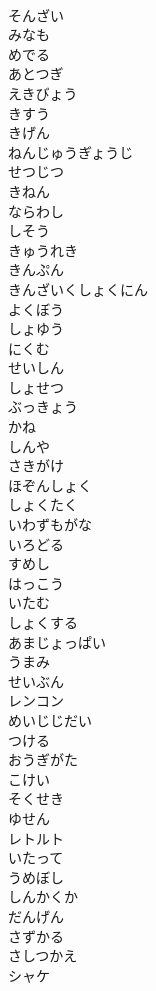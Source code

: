 \documentclass[8pt]{extreport}
\begin{document}
\begin{CJK}{UTF8}{min}
\\	そんざい
\\	みなも
\\	めでる
\\	あとつぎ
\\	えきびょう
\\	きすう
\\	きげん
\\	ねんじゅうぎょうじ
\\	せつじつ
\\	きねん
\\	ならわし
\\	しそう
\\	きゅうれき
\\	きんぷん
\\	きんざいくしょくにん
\\	よくぼう
\\	しょゆう
\\	にくむ
\\	せいしん
\\	しょせつ
\\	ぶっきょう
\\	かね
\\	しんや
\\	さきがけ
\\	ほぞんしょく
\\	しょくたく
\\	いわずもがな
\\	いろどる
\\	すめし
\\	はっこう
\\	いたむ
\\	しょくする
\\	あまじょっぱい
\\	うまみ
\\	せいぶん
\\	レンコン
\\	めいじじだい
\\	つける
\\	おうぎがた
\\	こけい
\\	そくせき
\\	ゆせん
\\	レトルト
\\	いたって
\\	うめぼし
\\	しんかくか
\\	だんげん
\\	さずかる
\\	さしつかえ
\\	シャケ

\end{CJK}
\end{document}
